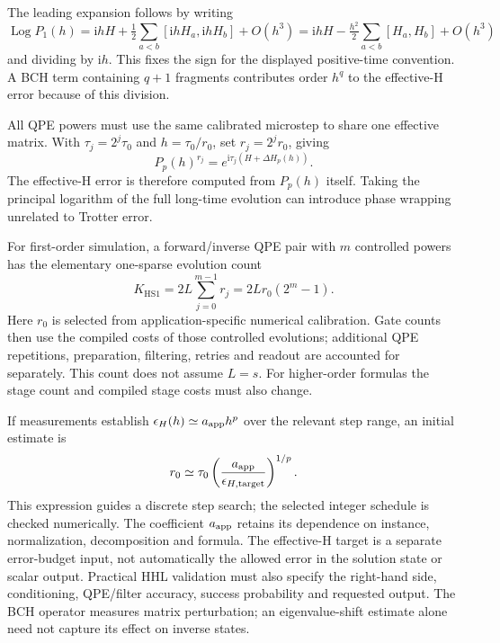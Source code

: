 The leading expansion follows by writing
\begin{equation}
 \operatorname{Log}P_1(h)
 =\mathrm{i}hH+\tfrac12\sum_{a<b}[\mathrm{i}hH_a,\mathrm{i}hH_b]
   +O(h^3)
 =\mathrm{i}hH-\tfrac{h^2}{2}\sum_{a<b}[H_a,H_b]+O(h^3)
\end{equation}
and dividing by $\mathrm{i}h$. This fixes the sign for the displayed positive-time convention. A BCH term containing $q+1$ fragments contributes order $h^q$ to the effective-H error because of this division.

All QPE powers must use the same calibrated microstep to share one effective matrix. With $\tau_j=2^j\tau_0$ and $h=\tau_0/r_0$, set $r_j=2^jr_0$, giving
\begin{equation}
 P_p(h)^{r_j}=e^{\mathrm{i}\tau_j(H+\Delta H_p(h))}.
\end{equation}
The effective-H error is therefore computed from $P_p(h)$ itself. Taking the principal logarithm of the full long-time evolution can introduce phase wrapping unrelated to Trotter error.

For first-order simulation, a forward/inverse QPE pair with $m$ controlled powers has the elementary one-sparse evolution count
\begin{equation}
 K_{\mathrm{HS1}}=2L\sum_{j=0}^{m-1}r_j
                =2Lr_0(2^m-1).
\end{equation}
Here $r_0$ is selected from application-specific numerical calibration. Gate counts then use the compiled costs of those controlled evolutions; additional QPE repetitions, preparation, filtering, retries and readout are accounted for separately. This count does not assume $L=s$. For higher-order formulas the stage count and compiled stage costs must also change.

If measurements establish $\epsilon_H(h)\simeq a_{\rm app}h^p$ over the relevant step range, an initial estimate is
\begin{equation}
 r_0\simeq\tau_0\left(\frac{a_{\rm app}}{\epsilon_{H,\rm target}}\right)^{1/p}.
\end{equation}
This expression guides a discrete step search; the selected integer schedule is checked numerically. The coefficient $a_{\rm app}$ retains its dependence on instance, normalization, decomposition and formula. The effective-H target is a separate error-budget input, not automatically the allowed error in the solution state or scalar output. Practical HHL validation must also specify the right-hand side, conditioning, QPE/filter accuracy, success probability and requested output. The BCH operator measures matrix perturbation; an eigenvalue-shift estimate alone need not capture its effect on inverse states.
